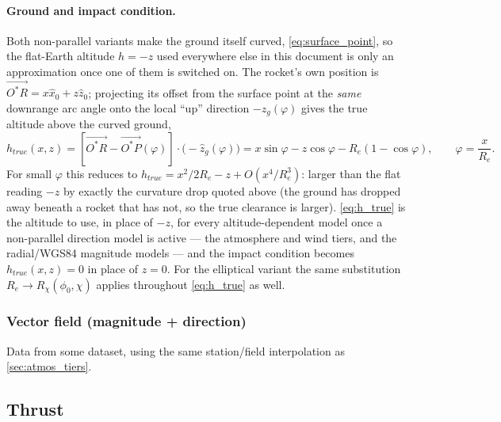 \paragraph{Ground and impact condition.} Both non-parallel variants make the ground itself
curved, \autoref{eq:surface_point}, so the flat-Earth altitude $h=-z$ used everywhere else in this
document is only an approximation once one of them is switched on. The rocket's own position is
$\vec{O^*R}=x\hat{x}_0+z\hat{z}_0$; projecting its offset from the surface point at the
\emph{same} downrange arc angle onto the local ``up'' direction $-\hat{z}_g(\varphi)$ gives the
true altitude above the curved ground,
\begin{equation} \label{eq:h_true}
    h_{true}(x,z) = \left[\vec{O^*R}-\vec{O^*P}(\varphi)\right]\cdot\bigl(-\hat{z}_g(\varphi)\bigr)
        = x\sin\varphi - z\cos\varphi - R_e(1-\cos\varphi), \qquad \varphi=\frac{x}{R_e}.
\end{equation}
For small $\varphi$ this reduces to $h_{true} = x^2/2R_e - z + O(x^4/R_e^3)$: larger than the flat
reading $-z$ by exactly the curvature drop quoted above (the ground has dropped away beneath a
rocket that has not, so the true clearance is larger). \autoref{eq:h_true} is the altitude to use,
in place of $-z$, for every altitude-dependent model once a non-parallel direction model is
active --- the atmosphere and wind tiers, and the radial/WGS84 magnitude models --- and the impact
condition becomes $h_{true}(x,z)=0$ in place of $z=0$. For the elliptical variant the same
substitution $R_e\to R_\chi(\phi_0,\chi)$ applies throughout \autoref{eq:h_true} as well.

\subsubsection{Vector field (magnitude + direction)}
Data from some dataset, using the same station/field interpolation as \autoref{sec:atmos_tiers}.

\subsection{Thrust}\label{sec:thrust}
